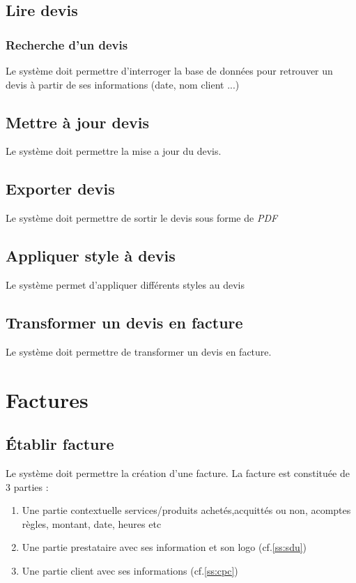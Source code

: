 \documentclass{article}
\begin{document}
    \subsection{Lire devis}
    \subsubsection{Recherche d'un devis}
    Le système doit permettre d'interroger la base de données pour retrouver
    un devis à partir de ses informations (date, nom client ...)
    \subsection{Mettre à jour devis}
    Le système doit permettre la mise a jour du devis.
    \subsection{Exporter devis}
    Le système doit permettre de sortir le devis sous forme de \emph{PDF}
    \subsection{Appliquer style à devis}
    Le système permet d'appliquer différents styles au devis
    
    \subsection{Transformer un devis en facture}
    Le système doit permettre de transformer un devis en facture.
\section{Factures}
    \subsection{Établir facture}
    Le système doit permettre la création d'une facture.
    La facture est constituée de 3 parties :
    \begin{enumerate}[leftmargin=0.55in]
    \item Une partie contextuelle services/produits achetés,acquittés ou non, acomptes règles, montant, date, heures etc
    \item Une partie prestataire avec ses information et son logo (cf.\ref{ss:sdu})
    \item Une partie client avec ses informations (cf.\ref{ss:cpc})
    \end{enumerate}
\end{document}
